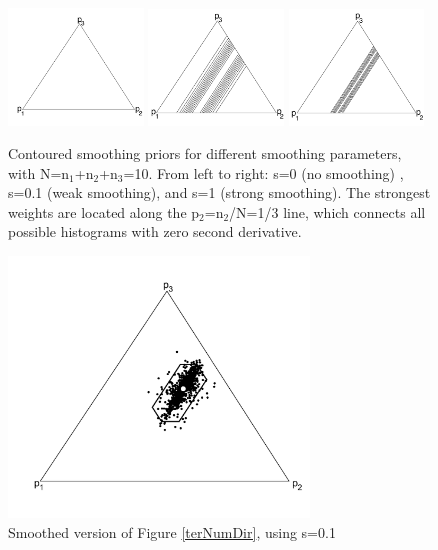 \documentclass{article}
\begin{document}
\begin{figure}[here]
  \centering
  \includegraphics[width=0.32\textwidth]{11c.pdf}
  \includegraphics[width=0.32\textwidth]{11b.pdf}
  \includegraphics[width=0.32\textwidth]{11a.pdf}
  \caption{
Contoured  smoothing priors for  different smoothing  parameters, with
N=n$_1$+n$_2$+n$_3$=10.   From left  to  right: s=0  (no smoothing)  ,
s=0.1  (weak smoothing),  and s=1  (strong smoothing).   The strongest
weights are  located along the p$_2$=n$_2$/N=1/3  line, which connects
all possible histograms with zero second derivative.}
  \label{fig:ternDirWeights}
\end{figure}

\begin{figure}[here]
  \centering
  \includegraphics[width=8cm]{12.pdf}
  \caption{Smoothed version of Figure \ref{terNumDir}, using
s=0.1 }
  \label{fig:smoothTernDir}
\end{figure}
\end{document}
